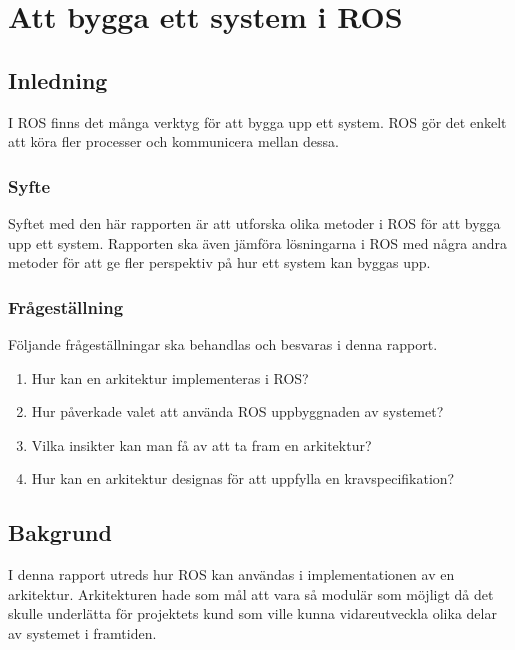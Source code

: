 \chapter{Att bygga ett system i ROS}
\label{cha:indiv-report-lundberg}

\section{Inledning}
\label{sec:introduction-lundberg}

I ROS finns det många verktyg för att bygga upp ett system. ROS gör det enkelt att köra fler processer och kommunicera mellan dessa.

\subsection{Syfte}
\label{sec:purpose-lundberg}

Syftet med den här rapporten är att utforska olika metoder i ROS för att bygga upp ett system. Rapporten ska även jämföra lösningarna i ROS med några andra metoder för att ge fler perspektiv på hur ett system kan byggas upp.

\subsection{Frågeställning}
\label{sec:issue-lundberg}

Följande frågeställningar ska behandlas och besvaras i denna rapport.

\begin{enumerate}
	\item Hur kan en arkitektur implementeras i ROS?
	
	\item Hur påverkade valet att använda ROS uppbyggnaden av systemet?
	
	\item Vilka insikter kan man få av att ta fram en arkitektur?
	
	\item Hur kan en arkitektur designas för att uppfylla en kravspecifikation?
\end{enumerate}

\section{Bakgrund}
\label{sec:background-lundberg}

I denna rapport utreds hur ROS kan användas i implementationen av en arkitektur. Arkitekturen hade som mål att vara så modulär som möjligt då det skulle underlätta för projektets kund som ville kunna vidareutveckla olika delar av systemet i framtiden.

